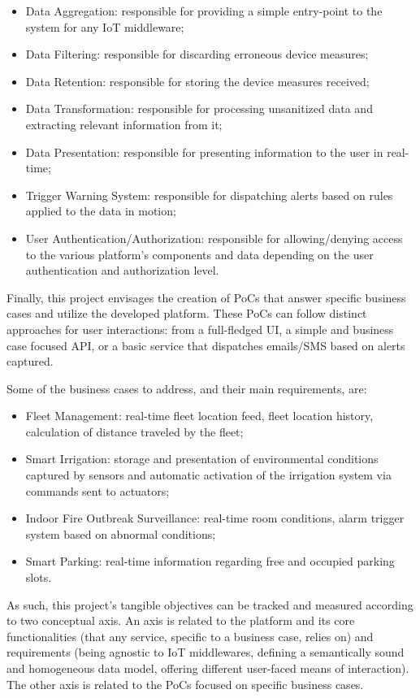 \begin{itemize}
    \item Data Aggregation: responsible for providing a simple entry-point to the system for any \gls{IoT} middleware;
    \item Data Filtering: responsible for discarding erroneous device measures;
    \item Data Retention: responsible for storing the device measures received;
    \item Data Transformation: responsible for processing unsanitized data and extracting relevant information from it;
    \item Data Presentation: responsible for presenting information to the user in real-time;
    \item Trigger Warning System: responsible for dispatching alerts based on rules applied to the data in motion;
    \item User Authentication/Authorization: responsible for allowing/denying access to the various platform's components and data depending on the user authentication and authorization level.
\end{itemize}

Finally, this project envisages the creation of \gls{PoC}s that answer specific business cases and utilize the developed platform. These \gls{PoC}s can follow distinct approaches for user interactions: from a full-fledged \gls{UI}, a simple and business case focused \gls{API}, or a basic service that dispatches emails/SMS based on alerts captured.

Some of the business cases to address, and their main requirements, are:

\begin{itemize}
    \item Fleet Management: real-time fleet location feed, fleet location history, calculation of distance traveled by the fleet;
    \item Smart Irrigation: storage and presentation of environmental conditions captured by sensors and automatic activation of the irrigation system via commands sent to actuators;
    \item Indoor Fire Outbreak Surveillance: real-time room conditions, alarm trigger system based on abnormal conditions;
    \item Smart Parking: real-time information regarding free and occupied parking slots.
\end{itemize}

As such, this project's tangible objectives can be tracked and measured according to two conceptual axis.
An axis is related to the platform and its core functionalities (that any service, specific to a business case, relies on) and requirements (being agnostic to \gls{IoT} middlewares, defining a semantically sound and homogeneous data model, offering different user-faced means of interaction). The other axis is related to the \gls{PoC}s focused on specific business cases.

